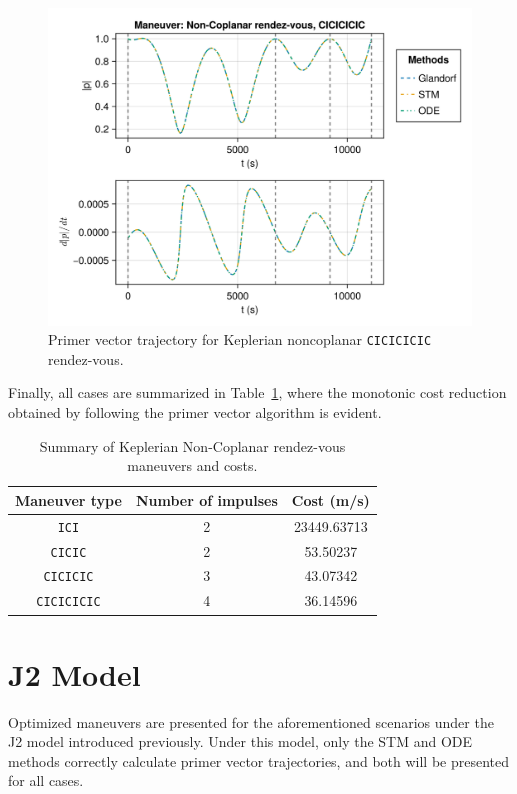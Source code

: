 \begin{figure}[htbp]
    \centering
    \includegraphics[width=0.8\linewidth]{../results/two_body/ipv_noncop/CICICICIC_primer_vector.png}
    \caption{Primer vector trajectory for Keplerian noncoplanar \texttt{CICICICIC} rendez-vous.}
    \label{fig:tb_ncop_CICICICIC_pv}
\end{figure}

Finally, all cases are summarized in Table~\ref{tab:Keplerian_nr_summary}, where the monotonic cost reduction obtained by following the primer vector algorithm is evident.

\begin{table}[htbp]
    \centering
    \begin{tabular}{ccc} \toprule
        Maneuver type & Number of impulses & Cost (m/s) \\ \midrule
        \texttt{ICI} & 2 & 23449.63713 \\
        \texttt{CICIC} & 2 & 53.50237 \\
        \texttt{CICICIC} & 3 & 43.07342 \\
        \texttt{CICICICIC} & 4 & 36.14596 \\\bottomrule
    \end{tabular}
    \caption{Summary of Keplerian Non-Coplanar rendez-vous maneuvers and costs.}
    \label{tab:Keplerian_nr_summary}
\end{table}

\newpage
\FloatBarrier
\section{J2 Model}

Optimized maneuvers are presented for the aforementioned scenarios under the J2 model introduced previously. Under this model, only the STM and ODE methods correctly calculate primer vector trajectories, and both will be presented for all cases.

